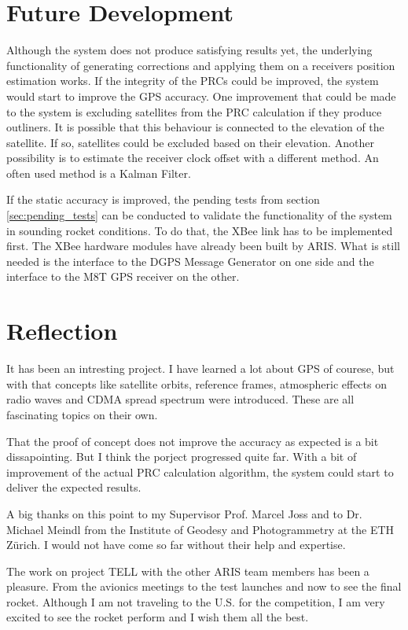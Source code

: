 \section{Future Development}

Although the system does not produce satisfying results yet, the underlying functionality of generating corrections and applying them on a receivers position estimation works.
If the integrity of the PRCs could be improved, the system would start to improve the GPS accuracy.
One improvement that could be made to the system is excluding satellites from the PRC calculation if they produce outliners.
It is possible that this behaviour is connected to the elevation of the satellite.
If so, satellites could be excluded based on their elevation.
Another possibility is to estimate the receiver clock offset with a different method.
An often used method is a Kalman Filter.

If the static accuracy is improved, the pending tests from section \ref{sec:pending_tests} can be conducted to validate the functionality of the system in sounding rocket conditions.
To do that, the XBee link has to be implemented first.
The XBee hardware modules have already been built by ARIS.
What is still needed is the interface to the DGPS Message Generator on one side and the interface to the M8T GPS receiver on the other.


\section{Reflection}

It has been an intresting project.
I have learned a lot about GPS of courese, but with that concepts like satellite orbits, reference frames, atmospheric effects on radio waves and CDMA spread spectrum were introduced. 
These are all fascinating topics on their own.

That the proof of concept does not improve the accuracy as expected is a bit dissapointing.
But I think the porject progressed quite far.
With a bit of improvement of the actual PRC calculation algorithm, the system could start to deliver the expected results.

A big thanks on this point to my Supervisor Prof. Marcel Joss and to Dr. Michael Meindl from the Institute of Geodesy and Photogrammetry at the ETH Z\"urich.
I would not have come so far without their help and expertise.

The work on project TELL with the other ARIS team members has been a pleasure.
From the avionics meetings to the test launches and now to see the final rocket.
Although I am not traveling to the U.S. for the competition, I am very excited to see the rocket perform and I wish them all the best.
